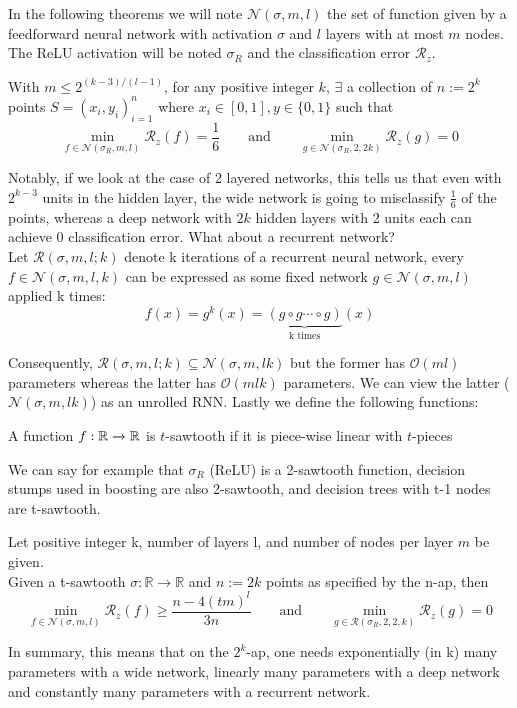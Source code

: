 \documentclass{article}
\begin{document}
In the following theorems we will note $\mathscr{N}(\sigma, m, l)$ the set of function given by a feedforward neural network with activation $\sigma$ and $l$ layers with at most $m$ nodes. The ReLU activation will be noted $\sigma_R$ and the classification error $\mathcal{R}_z$.

\begin{thm}
\label{thm:telgarskyffn}
With $m \leq 2^{(k-3)/(l-1)}$, for any positive integer $k$, $\exists$ a collection of $n:=2^k$ points $S = (x_i,y_i)^n_{i=1}$ where $x_i \in [0, 1], y \in \{0, 1\}$ such that \\
$$\min_{f\in\mathscr{N}(\sigma_R, m, l)} \mathcal{R}_z(f) = \frac{1}{6} \quad \quad \text{and} \quad \quad \min_{g\in\mathscr{N}(\sigma_R, 2, 2k)} \mathcal{R}_z(g) = 0$$
\end{thm}

Notably, if we look at the case of 2 layered networks, this tells us that even with $2^{k-3}$ units in the hidden layer, the wide network is going to misclassify $\frac{1}{6}$ of the points, whereas a deep network with $2k$ hidden layers with 2 units each can achieve 0 classification error. What about a recurrent network?  \\

Let $\mathscr{R}(\sigma, m, l; k)$ denote k iterations of a recurrent neural network, every $f \in \mathscr{N}(\sigma, m, l, k)$ can be expressed as some fixed network $g \in \mathscr{N}(\sigma, m, l)$ applied k times:
$$f(x) = g^k(x) = \underbrace{(g\circ g \cdots \circ g)}_\text{k times}(x)$$

Consequently, $\mathscr{R}(\sigma, m, l; k) \subseteq \mathscr{N}(\sigma, m, lk)$ but the former has $\mathcal{O}(ml)$ parameters whereas the latter has $\mathcal{O}(mlk)$ parameters. We can view the latter ($\mathscr{N}(\sigma, m, lk)$) as an unrolled RNN. Lastly we define the following functions:

\begin{defn}[Sawtooth]
A function $f: \mathbb{R} \xrightarrow{} \mathbb{R}$ is $t$-sawtooth if it is piece-wise linear with $t$-pieces
\end{defn}
We can say for example that $\sigma_R$ (ReLU) is a 2-sawtooth function, decision stumps used in boosting are also 2-sawtooth, and decision trees with t-1 nodes are t-sawtooth.

\begin{thm}
\label{thm:telgarskyrec}
Let positive integer k, number of layers l, and number of nodes per layer $m$ be given. \\
Given a t-sawtooth $\sigma : \mathbb{R} \to \mathbb{R}$ and $n := 2k$ points as specified by the n-ap, then \\
$$\min_{f\in\mathscr{N}(\sigma, m, l)} \mathcal{R}_z(f) \geq \frac{n-4(tm)^l}{3n} \quad \quad \text{and} \quad \quad \min_{g\in\mathscr{R}(\sigma_R, 2, 2, k)} \mathcal{R}_z(g) = 0$$
\end{thm}
In summary, this means that on the $2^k$-ap, one needs exponentially (in k) many parameters with a wide network, linearly many parameters with a deep network and constantly many parameters with a recurrent network.
\end{document}
